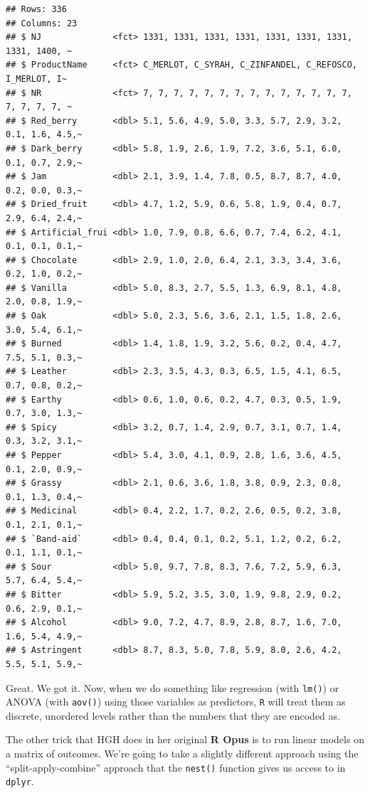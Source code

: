 \documentclass[
]{book}
\begin{document}
\begin{verbatim}
## Rows: 336
## Columns: 23
## $ NJ              <fct> 1331, 1331, 1331, 1331, 1331, 1331, 1331, 1331, 1400, ~
## $ ProductName     <fct> C_MERLOT, C_SYRAH, C_ZINFANDEL, C_REFOSCO, I_MERLOT, I~
## $ NR              <fct> 7, 7, 7, 7, 7, 7, 7, 7, 7, 7, 7, 7, 7, 7, 7, 7, 7, 7, ~
## $ Red_berry       <dbl> 5.1, 5.6, 4.9, 5.0, 3.3, 5.7, 2.9, 3.2, 0.1, 1.6, 4.5,~
## $ Dark_berry      <dbl> 5.8, 1.9, 2.6, 1.9, 7.2, 3.6, 5.1, 6.0, 0.1, 0.7, 2.9,~
## $ Jam             <dbl> 2.1, 3.9, 1.4, 7.8, 0.5, 8.7, 8.7, 4.0, 0.2, 0.0, 0.3,~
## $ Dried_fruit     <dbl> 4.7, 1.2, 5.9, 0.6, 5.8, 1.9, 0.4, 0.7, 2.9, 6.4, 2.4,~
## $ Artificial_frui <dbl> 1.0, 7.9, 0.8, 6.6, 0.7, 7.4, 6.2, 4.1, 0.1, 0.1, 0.1,~
## $ Chocolate       <dbl> 2.9, 1.0, 2.0, 6.4, 2.1, 3.3, 3.4, 3.6, 0.2, 1.0, 0.2,~
## $ Vanilla         <dbl> 5.0, 8.3, 2.7, 5.5, 1.3, 6.9, 8.1, 4.8, 2.0, 0.8, 1.9,~
## $ Oak             <dbl> 5.0, 2.3, 5.6, 3.6, 2.1, 1.5, 1.8, 2.6, 3.0, 5.4, 6.1,~
## $ Burned          <dbl> 1.4, 1.8, 1.9, 3.2, 5.6, 0.2, 0.4, 4.7, 7.5, 5.1, 0.3,~
## $ Leather         <dbl> 2.3, 3.5, 4.3, 0.3, 6.5, 1.5, 4.1, 6.5, 0.7, 0.8, 0.2,~
## $ Earthy          <dbl> 0.6, 1.0, 0.6, 0.2, 4.7, 0.3, 0.5, 1.9, 0.7, 3.0, 1.3,~
## $ Spicy           <dbl> 3.2, 0.7, 1.4, 2.9, 0.7, 3.1, 0.7, 1.4, 0.3, 3.2, 3.1,~
## $ Pepper          <dbl> 5.4, 3.0, 4.1, 0.9, 2.8, 1.6, 3.6, 4.5, 0.1, 2.0, 0.9,~
## $ Grassy          <dbl> 2.1, 0.6, 3.6, 1.8, 3.8, 0.9, 2.3, 0.8, 0.1, 1.3, 0.4,~
## $ Medicinal       <dbl> 0.4, 2.2, 1.7, 0.2, 2.6, 0.5, 0.2, 3.8, 0.1, 2.1, 0.1,~
## $ `Band-aid`      <dbl> 0.4, 0.4, 0.1, 0.2, 5.1, 1.2, 0.2, 6.2, 0.1, 1.1, 0.1,~
## $ Sour            <dbl> 5.0, 9.7, 7.8, 8.3, 7.6, 7.2, 5.9, 6.3, 5.7, 6.4, 5.4,~
## $ Bitter          <dbl> 5.9, 5.2, 3.5, 3.0, 1.9, 9.8, 2.9, 0.2, 0.6, 2.9, 0.1,~
## $ Alcohol         <dbl> 9.0, 7.2, 4.7, 8.9, 2.8, 8.7, 1.6, 7.0, 1.6, 5.4, 4.9,~
## $ Astringent      <dbl> 8.7, 8.3, 5.0, 7.8, 5.9, 8.0, 2.6, 4.2, 5.5, 5.1, 5.9,~
\end{verbatim}

Great. We got it. Now, when we do something like regression (with \texttt{lm()}) or ANOVA (with \texttt{aov()}) using those variables as predictors, \texttt{R} will treat them as discrete, unordered levels rather than the numbers that they are encoded as.

The other trick that HGH does in her original \textbf{R Opus} is to run linear models on a matrix of outcomes. We're going to take a slightly different approach using the ``split-apply-combine'' approach that the \texttt{nest()} function gives us access to in \texttt{dplyr}.
\end{document}
